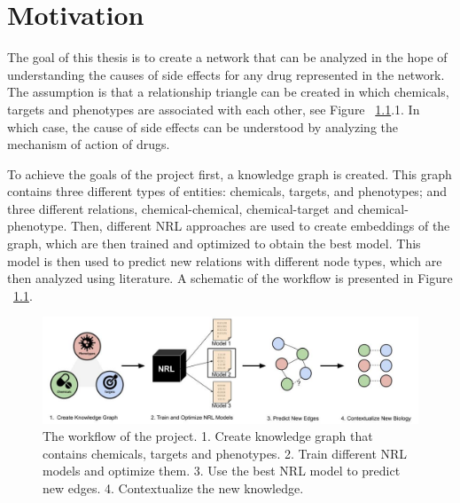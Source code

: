\chapter{Motivation}
\label{motivation}

The goal of this thesis is to create a network that can be analyzed in the hope of understanding the causes of side effects for any drug represented in the network. The assumption is that a relationship triangle can be created in which chemicals, targets and phenotypes are associated with each other, see Figure ~\ref{fig:workflow}.1. In which case, the cause of side effects can be understood by analyzing the mechanism of action of drugs.

To achieve the goals of the project first, a knowledge graph is created. This graph contains three different types of entities: chemicals, targets, and phenotypes; and three different relations, chemical-chemical, chemical-target and chemical-phenotype. Then, different \ac{NRL} approaches are used to create embeddings of the graph, which are then trained and optimized to obtain the best model. This model is then used to predict new relations with different node types, which are then analyzed using literature. A schematic of the workflow is presented in Figure ~\ref{fig:workflow}.

\begin{figure}[h!]
    \centering
    \includegraphics[scale=0.35]
    {figures/workflow.jpg}
    \caption [The workflow of the project]{\label{fig:workflow} The workflow of the project. 1. Create knowledge graph that contains chemicals, targets and phenotypes. 2. Train different NRL models and optimize them. 3. Use the best NRL model to predict new edges. 4. Contextualize the new knowledge.}
\end{figure}